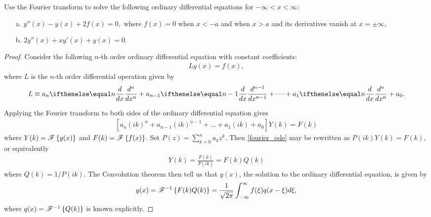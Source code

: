 \begin{problem}{2.8}
  Use the Fourier transform to solve the following ordinary differential equations
  for $-\infty < x < \infty$:
  \begin{enumerate}
    \item [a.] $y''(x) - y(x) + 2f(x) = 0,$ where $f(x) = 0$ when $x < -a$
      and when $x > a$ and its derivatives vanish at $x = \pm \infty$,
    \item [b.] $2 y''(x) + x y'(x) + y(x) = 0.$
  \end{enumerate}
\end{problem}

\begin{proof}
  Consider the following $n$-th order ordinary differential equation with constant
  coefficients:
  \begin{align*}
    L y(x) = f(x),
  \end{align*}
  where $L$ is the $n$-th order differential operation given by
  \begin{align*}
    L \equiv a_n \der{x}{n} + a_{n-1}\der{x}{n-1} + \dots + a_1 \der{x}{n} + a_0.
  \end{align*}

  Applying the Fourier transform to both sides of the ordinary differential equation gives
  \begin{align}\label{fourier_ode}
    \left[a_n (ik)^n + a_{n-1}(ik)^{n-1} + \dots +a_1(ik) + a_0\right]Y(k) = F(k)
  \end{align}
  where $Y(k) = \mathscr{F}\left\{ {y(x)} \right\}$ and $F(k) = \mathscr{F}\left\{ {f(x)} \right\}$. Set $P(z) = \sum_{k=0}^n a_k z^k$. Then
  \eqref{fourier_ode} may be rewritten as $P(ik)Y(k) = F(k),$ or equivalently
  \begin{align*}
    Y(k) = \frac{F(k)}{P(ik)} = F(k)Q(k)
  \end{align*}
  where $Q(k) = 1/P(ik)$. The Convolution theorem then tell us that $y(x)$, the solution to the
  ordinary differential equation, is given by
  \begin{align*}
    y(x) = \mathscr{F}^{-1}\left\{ {F(k)Q(k)} \right\}
    = \frac{1}{\sqrt{2\pi}}\int_{-\infty}^{\infty} f(\xi) q(x-\xi)d\xi,
  \end{align*}
  where $q(x) = \mathscr{F}^{-1}\left\{ {Q(k)} \right\}$ is known explicitly.


\end{proof}
